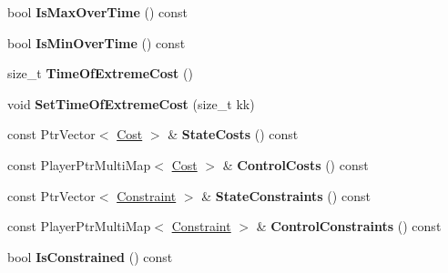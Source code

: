 \begin{DoxyCompactItemize}
\item 
bool {\bfseries Is\+Max\+Over\+Time} () const \hypertarget{classilqgames_1_1_player_cost_a1a07ef47dadd7821b19357062d74ab79}{}\label{classilqgames_1_1_player_cost_a1a07ef47dadd7821b19357062d74ab79}

\item 
bool {\bfseries Is\+Min\+Over\+Time} () const \hypertarget{classilqgames_1_1_player_cost_aff2f1b2d48982fa767c8cd9ad770710f}{}\label{classilqgames_1_1_player_cost_aff2f1b2d48982fa767c8cd9ad770710f}

\item 
size\+\_\+t {\bfseries Time\+Of\+Extreme\+Cost} ()\hypertarget{classilqgames_1_1_player_cost_a1bacfa4c40e98588431d67e1f4b96919}{}\label{classilqgames_1_1_player_cost_a1bacfa4c40e98588431d67e1f4b96919}

\item 
void {\bfseries Set\+Time\+Of\+Extreme\+Cost} (size\+\_\+t kk)\hypertarget{classilqgames_1_1_player_cost_ab1d9aea9b9f86f5fbc785cd8981ccd81}{}\label{classilqgames_1_1_player_cost_ab1d9aea9b9f86f5fbc785cd8981ccd81}

\item 
const Ptr\+Vector$<$ \hyperlink{classilqgames_1_1_cost}{Cost} $>$ \& {\bfseries State\+Costs} () const \hypertarget{classilqgames_1_1_player_cost_a16a676ec8d145d97d555cbebe79ac5fd}{}\label{classilqgames_1_1_player_cost_a16a676ec8d145d97d555cbebe79ac5fd}

\item 
const Player\+Ptr\+Multi\+Map$<$ \hyperlink{classilqgames_1_1_cost}{Cost} $>$ \& {\bfseries Control\+Costs} () const \hypertarget{classilqgames_1_1_player_cost_aa6d470d800deac7f52eb54ae180648c5}{}\label{classilqgames_1_1_player_cost_aa6d470d800deac7f52eb54ae180648c5}

\item 
const Ptr\+Vector$<$ \hyperlink{classilqgames_1_1_constraint}{Constraint} $>$ \& {\bfseries State\+Constraints} () const \hypertarget{classilqgames_1_1_player_cost_a5c0fdceae7cb5c2a41c9e2962fad63ea}{}\label{classilqgames_1_1_player_cost_a5c0fdceae7cb5c2a41c9e2962fad63ea}

\item 
const Player\+Ptr\+Multi\+Map$<$ \hyperlink{classilqgames_1_1_constraint}{Constraint} $>$ \& {\bfseries Control\+Constraints} () const \hypertarget{classilqgames_1_1_player_cost_a4de79c8a7df42e68d39cc5afdb7fa6a6}{}\label{classilqgames_1_1_player_cost_a4de79c8a7df42e68d39cc5afdb7fa6a6}

\item 
bool {\bfseries Is\+Constrained} () const \hypertarget{classilqgames_1_1_player_cost_a700b6b0ce1844c3f780cb59b28bc5cd8}{}\label{classilqgames_1_1_player_cost_a700b6b0ce1844c3f780cb59b28bc5cd8}

\end{DoxyCompactItemize}



